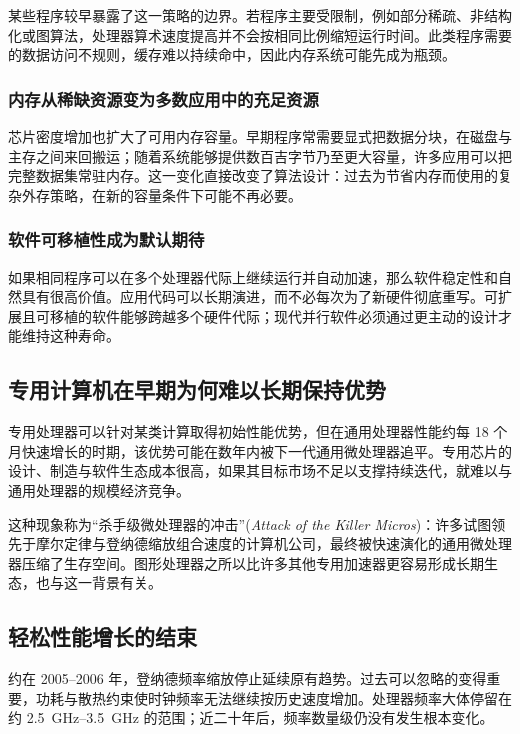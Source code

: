 某些程序较早暴露了这一策略的边界。若程序主要受限制，例如部分稀疏、非结构化或图算法，处理器算术速度提高并不会按相同比例缩短运行时间。此类程序需要的数据访问不规则，缓存难以持续命中，因此内存系统可能先成为瓶颈。

\subsubsection{内存从稀缺资源变为多数应用中的充足资源}

芯片密度增加也扩大了可用内存容量。早期程序常需要显式把数据分块，在磁盘与主存之间来回搬运；随着系统能够提供数百吉字节乃至更大容量，许多应用可以把完整数据集常驻内存。这一变化直接改变了算法设计：过去为节省内存而使用的复杂外存策略，在新的容量条件下可能不再必要。

\subsubsection{软件可移植性成为默认期待}

如果相同程序可以在多个处理器代际上继续运行并自动加速，那么软件稳定性和自然具有很高价值。应用代码可以长期演进，而不必每次为了新硬件彻底重写。可扩展且可移植的软件能够跨越多个硬件代际；现代并行软件必须通过更主动的设计才能维持这种寿命。

\subsection{专用计算机在早期为何难以长期保持优势}

专用处理器可以针对某类计算取得初始性能优势，但在通用处理器性能约每 18 个月快速增长的时期，该优势可能在数年内被下一代通用微处理器追平。专用芯片的设计、制造与软件生态成本很高，如果其目标市场不足以支撑持续迭代，就难以与通用处理器的规模经济竞争。

这种现象称为“杀手级微处理器的冲击”\allowbreak (\textit{Attack of the Killer Micros})：许多试图领先于摩尔定律与登纳德缩放组合速度的计算机公司，最终被快速演化的通用微处理器压缩了生存空间。图形处理器之所以比许多其他专用加速器更容易形成长期生态，也与这一背景有关。

\subsection{轻松性能增长的结束}

约在 2005--2006 年，登纳德频率缩放停止延续原有趋势。过去可以忽略的变得重要，功耗与散热约束使时钟频率无法继续按历史速度增加。处理器频率大体停留在约 \SIrange{2.5}{3.5}{\giga\hertz} 的范围；近二十年后，频率数量级仍没有发生根本变化。

